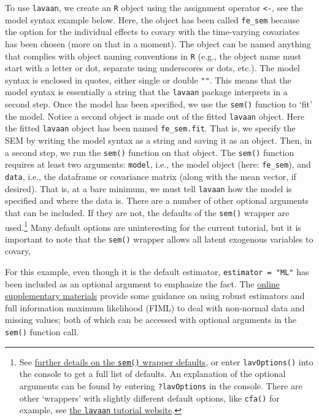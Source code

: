\documentclass[]{interact}
\theoremstyle{plain}%
\theoremstyle{definition}
\theoremstyle{remark}
\begin{document}
To use \texttt{lavaan}, we create an \texttt{R} object using the
assignment operator \texttt{\textless{}-}, see the model syntax example
below. Here, the object has been called \texttt{fe\_sem} because the
option for the individual effects to covary with the time-varying
covariates has been chosen (more on that in a moment). The object can be
named anything that complies with object naming conventions in
\texttt{R} (e.g., the object name must start with a letter or dot,
separate using underscores or dots, etc.). The model syntax is enclosed
in quotes, either single \texttt{\textquotesingle{}\textquotesingle{}}
or double \texttt{""}. This means that the model syntax is essentially a
string that the \texttt{lavaan} package interprets in a second step.
Once the model has been specified, we use the \texttt{sem()} function to
`fit' the model. Notice a second object is made out of the fitted
\texttt{lavaan} object. Here the fitted \texttt{lavaan} object has been
named \texttt{fe\_sem.fit}. That is, we specify the SEM by writing the
model syntax as a string and saving it as an object. Then, in a second
step, we run the \texttt{sem()} function on that object. The
\texttt{sem()} function requires at least two arguments: \texttt{model},
i.e., the model object (here: \texttt{fe\_sem}), and \texttt{data},
i.e., the dataframe or covariance matrix (along with the mean vector, if
desired). That is, at a bare minimum, we must tell \texttt{lavaan} how
the model is specified and where the data is. There are a number of
other optional arguments that can be included. If they are not, the
defaults of the \texttt{sem()} wrapper are used.\footnote{See
  \href{https://rdrr.io/cran/lavaan/man/sem.html}{further details on the
  \texttt{sem()} wrapper defaults}, or enter \texttt{lavOptions()} into
  the console to get a full list of defaults. An explanation of the
  optional arguments can be found by entering \texttt{?lavOptions} in
  the console. There are other `wrappers' with slightly different
  default options, like \texttt{cfa()} for example, see
  \href{https://lavaan.ugent.be/tutorial/cfa.html}{the \texttt{lavaan}
  tutorial website}.} Many default options are uninteresting for the
current tutorial, but it is important to note that the \texttt{sem()}
wrapper allows all latent exogenous variables to covary,

For this example, even though it is the default estimator,
\texttt{estimator\ =\ "ML"} has been included as an optional argument to
emphasize the fact. The
\href{https://github.com/henrik-andersen/FE-SEM/blob/master/simulation-code.R}{online
supplementary materials} provide some guidance on using robust
estimators and full information maximum likelihood (FIML) to deal with
non-normal data and missing values; both of which can be accessed with
optional arguments in the \texttt{sem()} function call.
\end{document}
